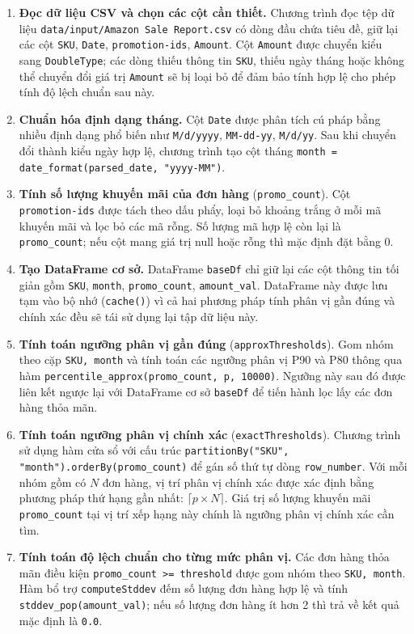 \begin{enumerate}
    \item \textbf{Đọc dữ liệu CSV và chọn các cột cần thiết.} Chương trình đọc tệp dữ liệu \texttt{data/input/Amazon Sale Report.csv} có dòng đầu chứa tiêu đề, giữ lại các cột \texttt{SKU}, \texttt{Date}, \texttt{promotion-ids}, \texttt{Amount}. Cột \texttt{Amount} được chuyển kiểu sang \texttt{DoubleType}; các dòng thiếu thông tin \texttt{SKU}, thiếu ngày tháng hoặc không thể chuyển đổi giá trị \texttt{Amount} sẽ bị loại bỏ để đảm bảo tính hợp lệ cho phép tính độ lệch chuẩn sau này.
    \item \textbf{Chuẩn hóa định dạng tháng.} Cột \texttt{Date} được phân tích cú pháp bằng nhiều định dạng phổ biến như \texttt{M/d/yyyy}, \texttt{MM-dd-yy}, \texttt{M/d/yy}. Sau khi chuyển đổi thành kiểu ngày hợp lệ, chương trình tạo cột tháng \texttt{month = date\_format(parsed\_date, "yyyy-MM")}.
    \item \textbf{Tính số lượng khuyến mãi của đơn hàng} (\texttt{promo\_count}). Cột \texttt{promotion-ids} được tách theo dấu phẩy, loại bỏ khoảng trắng ở mỗi mã khuyến mãi và lọc bỏ các mã rỗng. Số lượng mã hợp lệ còn lại là \texttt{promo\_count}; nếu cột mang giá trị null hoặc rỗng thì mặc định đặt bằng 0.
    \item \textbf{Tạo DataFrame cơ sở.} DataFrame \texttt{baseDf} chỉ giữ lại các cột thông tin tối giản gồm \texttt{SKU}, \texttt{month}, \texttt{promo\_count}, \texttt{amount\_val}. DataFrame này được lưu tạm vào bộ nhớ (\texttt{cache()}) vì cả hai phương pháp tính phân vị gần đúng và chính xác đều sẽ tái sử dụng lại tập dữ liệu này.
    \item \textbf{Tính toán ngưỡng phân vị gần đúng} (\texttt{approxThresholds}). Gom nhóm theo cặp \texttt{SKU, month} và tính toán các ngưỡng phân vị P90 và P80 thông qua hàm \texttt{percentile\_approx(promo\_count, p, 10000)}. Ngưỡng này sau đó được liên kết ngược lại với DataFrame cơ sở \texttt{baseDf} để tiến hành lọc lấy các đơn hàng thỏa mãn.
    \item \textbf{Tính toán ngưỡng phân vị chính xác} (\texttt{exactThresholds}). Chương trình sử dụng hàm cửa sổ với cấu trúc \texttt{partitionBy("SKU", "month").orderBy(promo\_count)} để gán số thứ tự dòng \texttt{row\_number}. Với mỗi nhóm gồm có $N$ đơn hàng, vị trí phân vị chính xác được xác định bằng phương pháp thứ hạng gần nhất: $\lceil p \times N \rceil$. Giá trị số lượng khuyến mãi \texttt{promo\_count} tại vị trí xếp hạng này chính là ngưỡng phân vị chính xác cần tìm.
    \item \textbf{Tính toán độ lệch chuẩn cho từng mức phân vị.} Các đơn hàng thỏa mãn điều kiện \texttt{promo\_count >= threshold} được gom nhóm theo \texttt{SKU, month}. Hàm bổ trợ \texttt{computeStddev} đếm số lượng đơn hàng hợp lệ và tính \texttt{stddev\_pop(amount\_val)}; nếu số lượng đơn hàng ít hơn 2 thì trả về kết quả mặc định là \texttt{0.0}.

\end{enumerate}

